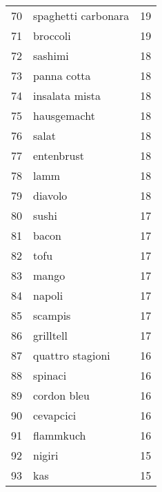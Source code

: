 \begin{tabular}{llr}
70   &                                spaghetti carbonara &     19 \\
71   &                                           broccoli &     19 \\
72   &                                            sashimi &     18 \\
73   &                                        panna cotta &     18 \\
74   &                                     insalata mista &     18 \\
75   &                                        hausgemacht &     18 \\
76   &                                              salat &     18 \\
77   &                                         entenbrust &     18 \\
78   &                                               lamm &     18 \\
79   &                                            diavolo &     18 \\
80   &                                              sushi &     17 \\
81   &                                              bacon &     17 \\
82   &                                               tofu &     17 \\
83   &                                              mango &     17 \\
84   &                                             napoli &     17 \\
85   &                                            scampis &     17 \\
86   &                                          grilltell &     17 \\
87   &                                   quattro stagioni &     16 \\
88   &                                            spinaci &     16 \\
89   &                                        cordon bleu &     16 \\
90   &                                          cevapcici &     16 \\
91   &                                          flammkuch &     16 \\
92   &                                             nigiri &     15 \\
93   &                                                kas &     15 \\

\end{tabular}
